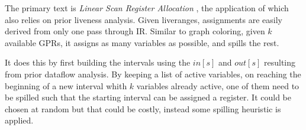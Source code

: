 \documentclass{article}
\begin{document}
The primary text is \textit{Linear Scan Register Allocation} \cite{linear}, the application of which also relies on prior liveness analysis. Given liveranges, assignments are easily derived from only one pass through IR.
Similar to graph coloring, given \(k\) available GPRs, it assigns  as many variables as possible, and spills the rest.

It does this by first building the intervals using the \(\mathit{in}[s]\) and \(\mathit{out}[s]\) resulting from prior dataflow analysis.
By keeping a list of active variables, on reaching the beginning of a new interval whith \(k\) variables already active, one of them need to be spilled such that the starting interval can be assigned a register. It could be chosen at random but that could be costly, instead some spilling heuristic is applied.



\end{document}
